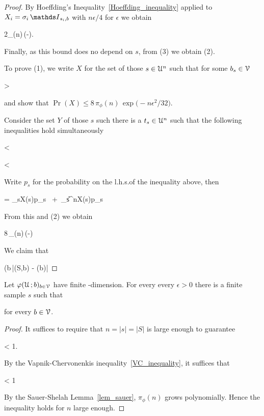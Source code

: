 \documentclass[scombinatorics.tex]{subfiles}
\begin{document}
\begin{proof}
  By Hoeffding's Inequality~\ref{Hoeffding_inequality} applied to $X_i=\sigma_i\,\Indicator_{s_i,b}$ with $n\epsilon/4$ for $\epsilon$ we obtain
  
  \ceq{}
  {\le}
  {2\pi_\phi(n)\,\exp\bigg(-\bigg).}

  Finally, as this bound does no depend on $s$, from (3) we obtain (2).

  To prove (1), we write $X$ for the set of those $s\in\EuScript U^n$ such that for some $b_s\in\EuScript V$
  
  {>}
  {\epsilon}

  and show that $\Pr(X)\le 8\,\pi_\phi(n)\,\exp\big(-n\epsilon^2/32\big)$.

Consider the set $Y$ of those $s$ such there is a $t_s\in\EuScript U^n$ such that the following inequalities hold simultaneously

  {<}
  {\frac{}}
  
  {<}
  {\frac{}}
  


  Write $p_s$ for the probability on the l.h.s.\@ of the inequality above, then  

  {=}
  {\sum_{s\in X}\Pr(s)\cdot p_s \ +\ \sum_{s\in\U^n\sm X}\Pr(s)\cdot p_s }

  From this and (2) we obtain 

  {\le}
  {8\,\pi_\phi(n)\,\exp\bigg(-\bigg)}

  We claim that

  {\le}
  {\Pr\bigg(\!\E b{\in}\V\,\big|\Fr(S,b) - \Pr(b)\big|\ge\frac{}}


\end{proof}

\begin{corollary}
  Let $\varphi(\EuScript U\,;b)_{b\in\EuScript V}$ have finite \vc-dimension. 
  For every every $\epsilon>0$ there is a finite sample $s$ such that

  \hfill for every $b\in\EuScript V$.
\end{corollary}
\begin{proof}
  It suffices to require that $n=|s|=|S|$ is large enough to guarantee 
  
  {<}
  {1}.

  By the Vapnik-Chervonenkis inequality~\ref{VC_inequality}, it suffices that

  {<}
  {1}

  By the Sauer-Shelah Lemma~\ref{lem_sauer}, $\pi_\phi(n)$ grows polynomially.
  Hence the inequality holds for $n$ large enough.
\end{proof}
\end{document}
